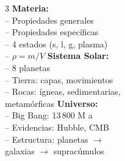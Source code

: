 \documentclass[11pt]{article}
\begin{document}
	\begin{tcolorbox}[colback=grisclaro, colframe=azulprim, arc=4pt,
		title=\textbf{Resumen de la Clase 1}, coltitle=white, colbacktitle=azulprim]
		\begin{multicols}{3}
			\textbf{Materia:}\\
			-- Propiedades generales\\
			-- Propiedades espec\'ificas\\
			-- 4 estados (s, l, g, plasma)\\
			-- $\rho = m/V$
			\columnbreak
			\textbf{Sistema Solar:}\\
			-- 8 planetas\\
			-- Tierra: capas, movimientos\\
			-- Rocas: \'igneas, sedimentarias,\\
			\phantom{--} metam\'orficas
			\columnbreak
			\textbf{Universo:}\\
			-- Big Bang: 13\,800 M a\\
			-- Evidencias: Hubble, CMB\\
			-- Estructura: planetas $\to$\\
			\phantom{--} galaxias $\to$ suprac\'umulos
		\end{multicols}
	\end{tcolorbox}
\end{document}
